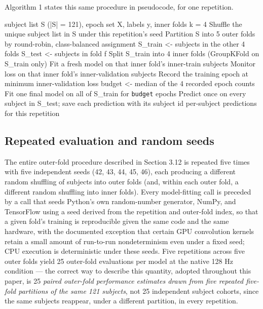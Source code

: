 \documentclass[a4paper,fleqn]{cas-sc}
\begin{document}
Algorithm 1 states this same procedure in pseudocode, for one repetition.



\begin{algorithm}[!htbp]
\caption{Nested, subject-grouped cross-validation (one repetition).}
\label{alg:1}
\begin{algorithmic}[1]
\Require subject list S (|S| = 121), epoch set X, labels y, inner folds k = 4
\State Shuffle the unique subject list in S under this repetition's seed
\State Partition S into 5 outer folds by round-robin, class-balanced assignment
\State S\_train <- subjects in the other 4 folds
\State S\_test <- subjects in fold f 
\State Split S\_train into 4 inner folds (GroupKFold on S\_train only)
\State Fit a fresh model on that inner fold's inner-train subjects
\State Monitor loss on that inner fold's inner-validation subjects
\State Record the training epoch at minimum inner-validation loss
\EndFor
\State budget <- median of the 4 recorded epoch counts
\State Fit one final model on all of S\_train for \texttt{budget} epochs 
\State Predict once on every subject in S\_test; save each prediction with its subject id
\EndFor
\Return per-subject predictions for this repetition
\end{algorithmic}
\end{algorithm}

\subsection{Repeated evaluation and random seeds}

The entire outer-fold procedure described in Section 3.12 is repeated five times with five independent seeds (42, 43, 44, 45, 46), each producing a different random shuffling of subjects into outer folds (and, within each outer fold, a different random shuffling into inner folds). Every model-fitting call is preceded by a call that seeds Python's own random-number generator, NumPy, and TensorFlow using a seed derived from the repetition and outer-fold index, so that a given fold's training is reproducible given the same code and the same hardware, with the documented exception that certain GPU convolution kernels retain a small amount of run-to-run nondeterminism even under a fixed seed; CPU execution is deterministic under these seeds. Five repetitions across five outer folds yield 25 outer-fold evaluations per model at the native 128 Hz condition --- the correct way to describe this quantity, adopted throughout this paper, is 25 \textit{paired outer-fold performance estimates drawn from five repeated five-fold partitions of the same 121 subjects}, not 25 independent subject cohorts, since the same subjects reappear, under a different partition, in every repetition.
\end{document}
